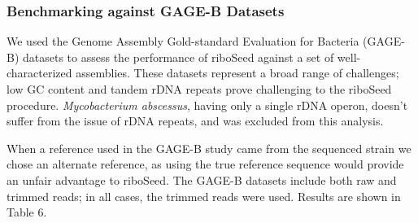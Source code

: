 \documentclass[10pt]{article}
\begin{document}
\begin{linenumbers}
\subsubsection*{Benchmarking against GAGE-B Datasets}
We used the Genome Assembly Gold-standard Evaluation for Bacteria (GAGE-B) datasets \cite{Magoc2013} to assess the performance of riboSeed against a set of well-characterized assemblies. These datasets represent a broad range of challenges; low GC content and tandem rDNA repeats prove challenging to the riboSeed procedure. \textit{Mycobacterium abscessus}, having only a single rDNA operon, doesn’t suffer from the issue of rDNA repeats, and was excluded from this analysis.


When a reference used in the GAGE-B study came from the sequenced strain we chose an alternate reference, as using the true reference sequence would provide an unfair advantage to riboSeed. The GAGE-B datasets include both raw and trimmed reads; in all cases, the trimmed reads were used. Results are shown in Table 6.


\end{linenumbers}
\end{document}
